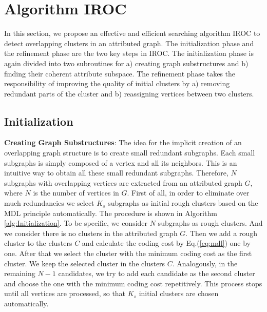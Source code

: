 \section{Algorithm IROC}
\noindent In this section, we propose an effective and efficient searching algorithm IROC to detect overlapping clusters in an attributed graph. The initialization phase and the refinement phase are the two key steps in IROC. The initialization phase is again divided into two subroutines for a) creating graph substructures and b) finding their coherent attribute subspace. The refinement phase takes the responsibility of improving the quality of initial clusters by a) removing redundant parts of the cluster and b) reassigning vertices between two clusters. 

\subsection{Initialization}
\noindent \textbf{Creating Graph Substructures}: The idea for the implicit creation of an overlapping graph structure is to create small redundant subgraphs. Each small subgraphs is simply composed of a vertex and all its neighbors. This is an intuitive way to obtain all these small redundant subgraphs. Therefore, $N$ subgraphs with overlapping vertices are extracted from an attributed graph $G$, where $N$ is the number of vertices in $G$. First of all, in order to eliminate over much redundancies we select $K_s$ subgraphs as initial rough clusters based on the MDL principle automatically. The procedure is shown in Algorithm \ref{alg:Initialization}. To be specific, we consider $N$ subgraphs as rough clusters. And we consider there is no clusters in the attributed graph $G$. Then we add a rough cluster to the clusters $C$ and calculate the coding cost by Eq.(\ref{eq:mdl}) one by one. After that we select the cluster with the minimum coding cost as the first cluster. We keep the selected cluster in the clusters $C$. Analogously, in the remaining $N-1$ candidates, we try to add each candidate as the second cluster and choose the one with the minimum coding cost repetitively. This process stops until all vertices are processed, so that $K_s$ initial clusters are chosen automatically.
\\

